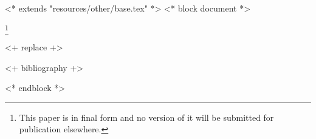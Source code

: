 <* extends "resources/other/base.tex" *>
<* block document *>
\subjclass[2020]{\docclasses}
\keywords{\dockeywords}



\title[\shorttitlename]{\titlename}
\author{<+ user.name +>}
\address{<+ user.institution +>, <+ user.address +>}
\thanks{This paper is in final form and no version of it will be submitted for publication elsewhere.}

\begin{abstract}
    <+ replace +>
\end{abstract}

\maketitle
\tableofcontents

<+ replace +>

<+ bibliography +>


<* endblock *>
